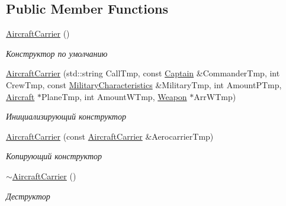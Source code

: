 \subsection*{Public Member Functions}
\begin{DoxyCompactItemize}
\item 
\mbox{\label{class_aircraft_carrier_group_1_1_aircraft_carrier_a0eca59a4e28727be647e108a02feccb6}} 
\mbox{\hyperlink{class_aircraft_carrier_group_1_1_aircraft_carrier_a0eca59a4e28727be647e108a02feccb6}{Aircraft\+Carrier}} ()
\begin{DoxyCompactList}\small\item\em Конструктор по умолчанию \end{DoxyCompactList}\item 
\mbox{\hyperlink{class_aircraft_carrier_group_1_1_aircraft_carrier_a612d60f0e6c3b14158ab3b6efb63c7d5}{Aircraft\+Carrier}} (std\+::string Call\+Tmp, const \mbox{\hyperlink{struct_aircraft_carrier_group_1_1_captain}{Captain}} \&Commander\+Tmp, int Crew\+Tmp, const \mbox{\hyperlink{class_aircraft_carrier_group_1_1_military_characteristics}{Military\+Characteristics}} \&Military\+Tmp, int Amount\+P\+Tmp, \mbox{\hyperlink{class_aircraft_carrier_group_1_1_aircraft}{Aircraft}} $\ast$Plane\+Tmp, int Amount\+W\+Tmp, \mbox{\hyperlink{class_aircraft_carrier_group_1_1_weapon}{Weapon}} $\ast$Arr\+W\+Tmp)
\begin{DoxyCompactList}\small\item\em Инициализирующий конструктор \end{DoxyCompactList}\item 
\mbox{\hyperlink{class_aircraft_carrier_group_1_1_aircraft_carrier_a06e80069d3a9240871e6af9018cec8b9}{Aircraft\+Carrier}} (const \mbox{\hyperlink{class_aircraft_carrier_group_1_1_aircraft_carrier}{Aircraft\+Carrier}} \&Aerocarrier\+Tmp)
\begin{DoxyCompactList}\small\item\em Копирующий конструктор \end{DoxyCompactList}\item 
\mbox{\label{class_aircraft_carrier_group_1_1_aircraft_carrier_ace72f0b7cd3dc96d95652233f3aec670}} 
\mbox{\hyperlink{class_aircraft_carrier_group_1_1_aircraft_carrier_ace72f0b7cd3dc96d95652233f3aec670}{$\sim$\+Aircraft\+Carrier}} ()
\begin{DoxyCompactList}\small\item\em Деструктор \end{DoxyCompactList}\item 

\end{DoxyCompactItemize}
